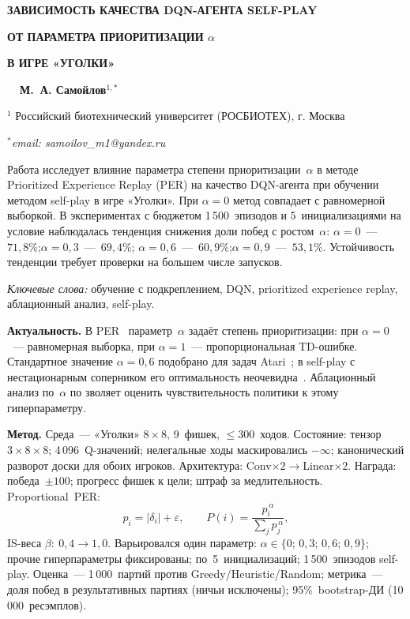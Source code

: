 \documentclass[oneside, a5paper,10pt]{article}
\begin{document}
\pagestyle{fancy}
\fancyhead{}\fancyfoot{}
\cfoot{\thepage}

\centerline{\bf ЗАВИСИМОСТЬ КАЧЕСТВА DQN-АГЕНТА SELF-PLAY}
\centerline{\bf ОТ ПАРАМЕТРА ПРИОРИТИЗАЦИИ $\alpha$}
\centerline{\bf В ИГРЕ «УГОЛКИ»}

\smallskip
\centerline{\bf \ \ М.~А. Самойлов$^{1,*}$}
\smallskip
\centerline{$^{1}$ Российский биотехнический университет (РОСБИОТЕХ), г. Москва}
\centerline{$^{*}$\it email: samoilov\_m1@yandex.ru}
\medskip

Работа исследует влияние параметра степени приоритизации~$\alpha$ в методе
Prioritized Experience Replay (PER) на качество DQN-агента при обучении методом
self-play в игре «Уголки». При $\alpha{=}0$ метод совпадает с равномерной
выборкой. В экспериментах с бюджетом 1\,500~эпизодов и 5~инициализациями
на условие наблюдалась тенденция снижения доли побед с ростом~$\alpha$:
$\alpha{=}0$~---~$71{,}8\%$;\enspace $\alpha{=}0{,}3$~---~$69{,}4\%$;\enspace
$\alpha{=}0{,}6$~---~$60{,}9\%$;\enspace $\alpha{=}0{,}9$~---~$53{,}1\%$.
Устойчивость тенденции требует проверки на большем числе запусков.

\smallskip
\textit{Ключевые слова:} обучение с подкреплением, DQN, prioritized experience
replay, аблационный анализ, self-play.
\smallskip

\textbf{Актуальность.}
В PER~\cite{Schaul16} параметр~$\alpha$ задаёт степень приоритизации: при
$\alpha{=}0$~--- равномерная выборка, при $\alpha{=}1$~--- пропорциональная
TD-ошибке. Стандартное значение $\alpha{=}0{,}6$ подобрано для задач
Atari~\cite{Mnih15}; в self-play с нестационарным соперником его оптимальность
неочевидна~\cite{Hessel18}. Аблационный анализ по~$\alpha$ по   зволяет
оценить чувствительность политики к этому гиперпараметру.

\textbf{Метод.}
Среда~--- «Уголки» $8{\times}8$, 9~фишек, $\le 300$~ходов. Состояние:
тензор $3{\times}8{\times}8$; 4\,096~Q-значений; нелегальные ходы маскировались
$-\infty$; канонический разворот доски для обоих игроков. Архитектура:
Conv${\times}2\to$Linear${\times}2$. Награда: победа~$\pm100$; прогресс фишек к цели; штраф за медлительность. Proportional~PER:
\begin{equation}\label{Eq1}
    p_i = |\delta_i|+\varepsilon,\qquad
    P(i)=\frac{p_i^{\,\alpha}}{\sum_j p_j^{\,\alpha}},
\end{equation}
IS-веса $\beta{:}\ 0{,}4{\to}1{,}0$. Варьировался один параметр:
$\alpha \in \{0;\,0{,}3;\,0{,}6;\,0{,}9\}$; прочие гиперпараметры фиксированы;
по~5~инициализаций; 1\,500~эпизодов self-play. Оценка~--- 1\,000~партий
против Greedy/Heuristic/Random; метрика~--- доля побед в результативных
партиях (ничьи исключены); 95\%~bootstrap-ДИ (10\,000~ресэмплов).
\end{document}
